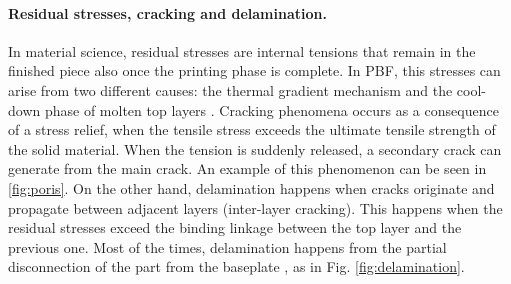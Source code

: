 \paragraph{Residual stresses, cracking and delamination.} In material science, residual stresses are internal tensions that remain in the finished piece also once the printing phase is complete. In PBF, this stresses can arise from two different causes: the thermal gradient mechanism and the cool-down phase of molten top layers \cite{mercelis_residual_2006}. Cracking phenomena occurs as a consequence of a stress relief, when the tensile stress exceeds the ultimate tensile strength of the solid material. When the tension is suddenly released, a secondary crack can generate from the main crack. An example of this phenomenon can be seen in \ref{fig:poris}. On the other hand, delamination happens when cracks originate and propagate between adjacent layers (inter-layer cracking). This happens when the residual stresses exceed the binding linkage between the top layer and the previous one. Most of the times, delamination happens from the partial disconnection of the part from the baseplate \cite{sames_metallurgy_2016}, as in Fig. \ref{fig:delamination}.
